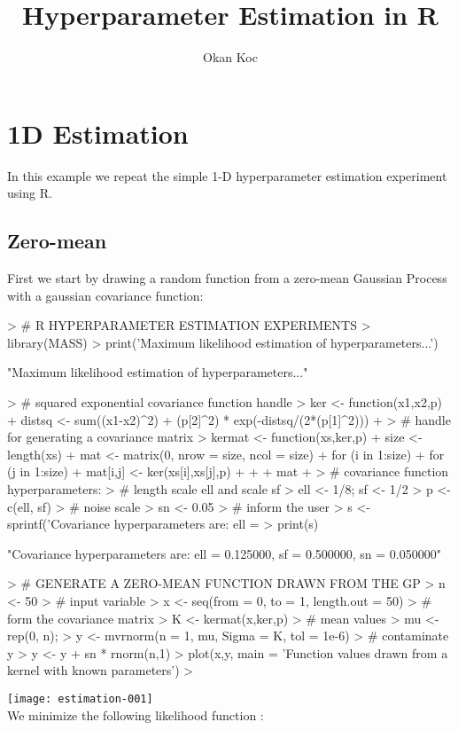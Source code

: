 \documentclass[a4paper]{article}
\title{Hyperparameter Estimation in R}
\author{Okan Koc}
\begin{document}
\maketitle

\section{1D Estimation}
In this example we repeat the simple 1-D hyperparameter estimation experiment using R. 

\subsection{Zero-mean}
First we start by drawing a random function from a zero-mean Gaussian Process with a gaussian covariance function:	

\begin{Schunk}
\begin{Sinput}
> # R HYPERPARAMETER ESTIMATION EXPERIMENTS
> library(MASS)
> print('Maximum likelihood estimation of hyperparameters...')
\end{Sinput}
\begin{Soutput}
[1] "Maximum likelihood estimation of hyperparameters..."
\end{Soutput}
\begin{Sinput}
> # squared exponential covariance function handle
> ker <- function(x1,x2,p) {
+ 	distsq <- sum((x1-x2)^2)
+ 	(p[2]^2) * exp(-distsq/(2*(p[1]^2)))
+ }
> # handle for generating a covariance matrix
> kermat <- function(xs,ker,p) {
+ 	size <- length(xs)
+ 	mat <- matrix(0, nrow = size, ncol = size)
+ 	for (i in 1:size) {
+ 		for (j in 1:size) {
+ 			mat[i,j] <- ker(xs[i],xs[j],p)
+ 		}
+ 	}
+ 	mat
+ }
> # covariance function hyperparameters: 
> # length scale ell and scale sf
> ell <- 1/8; sf <- 1/2
> p <- c(ell, sf)
> # noise scale
> sn <- 0.05
> # inform the user
> s <- sprintf('Covariance hyperparameters are: ell = %f, sf = %f, sn = %f', ell, sf, sn)
> print(s)
\end{Sinput}
\begin{Soutput}
[1] "Covariance hyperparameters are: ell = 0.125000, sf = 0.500000, sn = 0.050000"
\end{Soutput}
\begin{Sinput}
> # GENERATE A ZERO-MEAN FUNCTION DRAWN FROM THE GP 
> n <- 50
> # input variable
> x <- seq(from = 0, to = 1, length.out = 50)
> # form the covariance matrix
> K <- kermat(x,ker,p)
> # mean values
> mu <- rep(0, n);
> y <- mvrnorm(n = 1, mu, Sigma = K, tol = 1e-6)
> # contaminate y
> y <- y + sn * rnorm(n,1)
> plot(x,y, main = 'Function values drawn from a kernel with known parameters')
> 
\end{Sinput}
\end{Schunk}
\texttt{[image: estimation-001]}
\\
We minimize the following likelihood function : 
\end{document}
